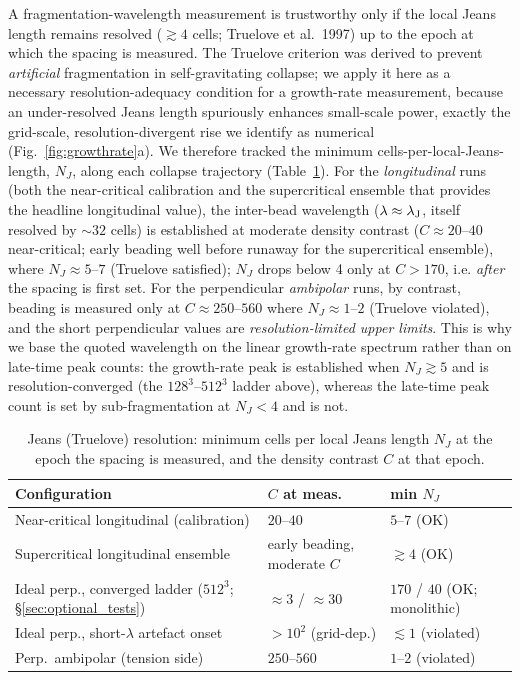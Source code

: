 \documentclass[usenatbib,twoside,twocolumn]{mnras}
\begin{document}
A fragmentation-wavelength measurement is trustworthy only if the local Jeans length remains resolved ($\gtrsim4$ cells; Truelove et al.\ 1997) up to the epoch at which the spacing is measured. The Truelove criterion was derived to prevent \emph{artificial} fragmentation in self-gravitating collapse; we apply it here as a necessary resolution-adequacy condition for a growth-rate measurement, because an under-resolved Jeans length spuriously enhances small-scale power, exactly the grid-scale, resolution-divergent rise we identify as numerical (Fig.~\ref{fig:growthrate}a). We therefore tracked the minimum cells-per-local-Jeans-length, $N_J$, along each collapse trajectory (Table~\ref{tab:truelove}). For the \emph{longitudinal} runs (both the near-critical calibration and the supercritical ensemble that provides the headline longitudinal value), the inter-bead wavelength ($\lambda\approx\lambda_{\rm J}$, itself resolved by $\sim32$ cells) is established at moderate density contrast ($C\approx20$--$40$ near-critical; early beading well before runaway for the supercritical ensemble), where $N_J\approx5$--$7$ (Truelove satisfied); $N_J$ drops below 4 only at $C>170$, i.e. \emph{after} the spacing is first set. For the perpendicular \emph{ambipolar} runs, by contrast, beading is measured only at $C\approx250$--$560$ where $N_J\approx1$--$2$ (Truelove violated), and the short perpendicular values are \emph{resolution-limited upper limits}. This is why we base the quoted wavelength on the linear growth-rate spectrum rather than on late-time peak counts: the growth-rate peak is established when $N_J\gtrsim5$ and is resolution-converged (the $128^3$--$512^3$ ladder above), whereas the late-time peak count is set by sub-fragmentation at $N_J<4$ and is not.

\begin{table}
\caption{Jeans (Truelove) resolution: minimum cells per local Jeans length $N_J$ at the epoch the spacing is measured, and the density contrast $C$ at that epoch.}
\label{tab:truelove}
\footnotesize
\setlength{\tabcolsep}{3pt}
\begin{tabular}{@{}p{3.0cm}p{1.9cm}p{2.5cm}@{}}
\toprule
Configuration & $C$ at meas. & min $N_J$ \\
\midrule
Near-critical longitudinal (calibration) & $20$--$40$ & $5$--$7$ (OK) \\
Supercritical longitudinal ensemble & early beading, moderate $C$ & $\gtrsim4$ (OK) \\
Ideal perp., converged ladder ($512^3$; \S\ref{sec:optional_tests}) & $\approx3$ / $\approx30$ & $170$ / $40$ (OK; monolithic) \\
Ideal perp., short-$\lambda$ artefact onset & $>10^2$ (grid-dep.) & $\lesssim1$ (violated) \\
Perp.\ ambipolar (tension side) & $250$--$560$ & $1$--$2$ (violated) \\
\bottomrule
\end{tabular}
\end{table}
\end{document}

